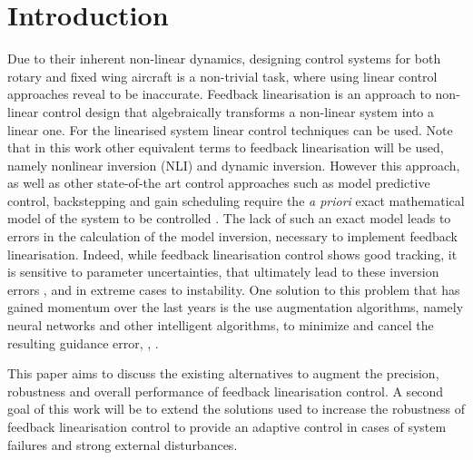 
\chapter{Introduction}
\label{chapter:introduction}


Due to their inherent non-linear dynamics, designing control systems for both rotary and fixed wing aircraft is a non-trivial task, where using linear control approaches reveal to be inaccurate. Feedback linearisation is an approach to non-linear control design that algebraically transforms a non-linear system into a linear one. For the linearised system linear control techniques can be used. Note that in this work other equivalent terms to feedback linearisation will be used, namely nonlinear inversion (NLI) and dynamic inversion. 
However this approach, as well as other state-of-the art control approaches such as model predictive control, backstepping and gain scheduling require the \textit{a priori} exact mathematical model of the system to be controlled \cite{SotA_IFCS}. The lack of such an exact model leads to errors in the calculation of the model inversion, necessary to implement feedback linearisation. Indeed, while feedback linearisation control shows good tracking, it is sensitive to parameter uncertainties, that ultimately lead to these inversion errors \cite{SotA_ControlAlgorithm}, and in extreme cases to instability. One solution to this problem that has gained momentum over the last years is the use augmentation algorithms, namely neural networks and other intelligent algorithms, to minimize and cancel the resulting guidance error\cite{NLI+NN}, \cite{NLI+NN_IFCS}, \cite{NLI+NN_chinese}. 

This paper aims to discuss the existing alternatives to augment the precision, robustness and overall performance of feedback linearisation control. A second goal of this work will be to extend the solutions used to increase the robustness of feedback linearisation control to provide an adaptive control in cases of system failures and strong external disturbances.



